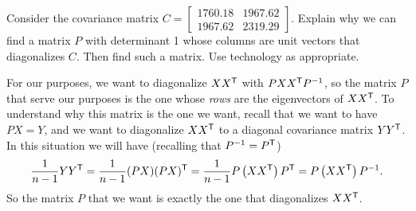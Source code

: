 \begin{pactivity} \label{act:PCA_diagonalize} Consider the covariance matrix $C =  \left[ \begin{array}{cc}  1760.18&1967.62\\ 1967.62&2319.29 \end{array} \right]$.  Explain why we can find a matrix $P$ with determinant 1 whose columns are unit vectors that diagonalizes $C$. Then find such a matrix. Use technology as appropriate. 

\end{pactivity}

For our purposes, we want to diagonalize $XX^{\mathsf{T}}$ with $PXX^{\mathsf{T}}P^{-1}$, so the matrix $P$ that serve our purposes is the one whose \emph{rows} are the eigenvectors of $XX^{\mathsf{T}}$. To understand why this matrix is the one we want, recall that we want to have $PX = Y$, and we want to diagonalize $XX^{\mathsf{T}}$ to a diagonal covariance matrix $YY^{\mathsf{T}}$. In this situation we will have (recalling that $P^{-1}=P^{\mathsf{T}}$)
\[\frac{1}{n-1}YY^{\mathsf{T}} = \frac{1}{n-1}(PX)(PX)^{\mathsf{T}} = \frac{1}{n-1}P\left(XX^{\mathsf{T}}\right)P^{\mathsf{T}} = P\left(XX^{\mathsf{T}}\right)P^{-1} .\]
So the matrix $P$ that we want is exactly the one that diagonalizes $XX^{\mathsf{T}}$. 

